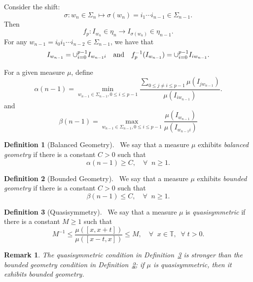 \documentclass[11pt]{amsart}
\newtheorem{remark}{Remark}
\theoremstyle{definition}
\newtheorem{definition}{Definition}
\def\m{\mu}
\def\T{\mathbb{T}}
\def\s{\sigma}
\def\Si{\Sigma}
\def\s{\sigma}
\begin{document}
Consider the shift:
$$
\s : w_{n} \in \Si_{n}\mapsto \s(w_{n}) = i_{1}\cdots i_{n-1}\in \Si_{n-1}.
$$
Then
$$
f_{p}: I_{w_{n}}\in \eta_{n}\to I_{\s(w_{n})}\in \eta_{n-1}.
$$ 
For any $w_{n-1}=i_{0}i_{1}\cdots i_{n-2}\in \Si_{n-1}$, we have that 
$$
I_{w_{n-1}}= \cup_{i=0}^{p-1} I_{w_{n-1}i}\quad \hbox{and}\quad
f^{-1}_{p}(I_{w_{n-1}})=\cup_{i=0}^{p-1} I_{iw_{n-1}}.
$$

For a given measure $\mu$, define
$$
\alpha (n-1)= \min_{w_{n-1}\in \Si_{n-1}, 0\leq i\leq p-1} \frac{\sum_{0\leq j\not=i\leq p-1} \m (I_{j w_{n-1}})}{\m(I_{iw_{n-1}})}.
$$
and 
$$
\beta (n-1) = \max_{w_{n-1}\in \Si_{n-1}, 0\leq i\leq p-1} \frac{\mu (I_{w_{n-1}})}{\mu(I_{w_{n-1}i})}
$$
\medskip
\begin{definition}[Balanced Geometry]~\label{bgeo}
We say that a measure $\m$ exhibits {\em balanced geometry} if there is a constant $C>0$ such that
$$
\alpha (n-1)\geq C, \quad \forall\;\; n\geq 1.
$$
\end{definition}

\medskip
\begin{definition}[Bounded Geometry]~\label{bdgeo}
We say that a measure $\m$ exhibits {\em bounded geometry} if there is a constant $C>0$ such that
$$
\beta (n-1) \leq C, \quad \forall\;\; n\geq 1.
$$
\end{definition}

\medskip
\begin{definition}[Quasisymmetry]~\label{qscc}
We say that a measure $\m$ is {\em quasisymmetric} 
if there is a constant $M\geq 1$ such that 
$$
M^{-1} \leq \frac{\mu([x, x+t])}{\mu([x-t,x])} \leq M, \quad \forall\;\; x\in \mathbb{T}, \;\; \forall \;t>0.
$$
\end{definition}

\medskip
\begin{remark}
The quasisymmetric condition in Definition~\ref{qscc} is stronger than the bounded geometry condition in Definition~\ref{bdgeo}; if $\mu$ is quasisymmetric, then it exhibits bounded geometry.   
\end{remark}

%
\end{document}
